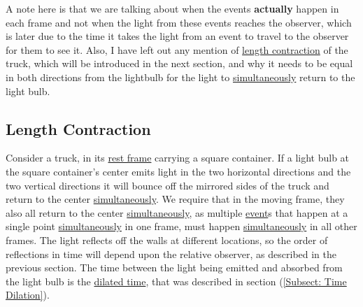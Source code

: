 A note here is that we are talking about when the events \textbf{actually} happen in each frame and not when the light from these events reaches the observer, which is later due to the time it takes the light from an event to travel to the observer for them to see it.
Also, I have left out any mention of \hyperlink{def-length-contraction}{length contraction} of the truck, which will be introduced in the next section, and why it needs to be equal in both directions from the lightbulb for the light to \hyperlink{def-simultaneity}{simultaneously} return to the light bulb.


\subsection{Length Contraction} \label{subsect: Length Contraction}

Consider a truck, in its \hyperlink{def-proper-frame}{rest frame} carrying a square container.
If a light bulb at the square container's center emits light in the two horizontal directions and the two vertical directions it will bounce off the mirrored sides of the truck and return to the center \hyperlink{def-simultaneity}{simultaneously}.
We require that in the moving frame, they also all return to the center \hyperlink{def-simultaneity}{simultaneously}, as multiple \hyperlink{def-event}{event}s that happen at a single point \hyperlink{def-simultaneity}{simultaneously} in one frame, must happen \hyperlink{def-simultaneity}{simultaneously} in all other frames.
The light reflects off the walls at different locations, so the order of reflections in time will depend upon the relative observer, as described in the previous section.
The time between the light being emitted and absorbed from the light bulb is the \hyperlink{def-time-dilation}{dilated time}, that was described in section (\ref{Subsect: Time Dilation}).

